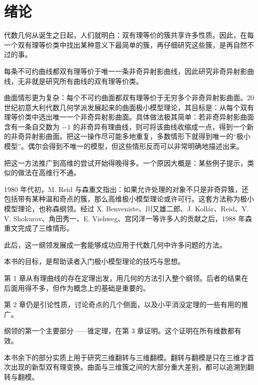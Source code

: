 
\chapter*{绪论}

代数几何从诞生之日起，人们就明白：双有理等价的簇共享许多性质。因此，在每一个双有理等价类中找出某种意义下最简单的簇，再仔细研究这些簇，是再自然不过的事。

每条不可约曲线都双有理等价于唯一一条非奇异射影曲线，因此研究非奇异射影曲线，无非就是研究所有曲线的双有理等价类。

曲面情形更为复杂：每个不可约曲面都双有理等价于无穷多个非奇异射影曲面。20 世纪初意大利代数几何学派发展起来的曲面极小模型理论，其目标是：从每个双有理等价类中选出唯一一个非奇异射影曲面。具体做法极其简单：若非奇异射影曲面含有一条自交数为 $-1$ 的非奇异有理曲线，则可将该曲线收缩成一点，得到一个新的非奇异射影曲面。把这一操作尽可能多地重复，多数情形下就得到唯一的“极小模型”。偶尔会得到不唯一的模型，但这些情形反而可以非常明确地描述出来。

把这一方法推广到高维的尝试开始得晚得多。一个原因大概是：某些例子提示，类似的做法在高维行不通。

1980 年代初，M. Reid 与森重文指出：如果允许处理的对象不只是非奇异簇，还包括带有某种温和奇点的簇，那么高维极小模型理论或许可行。这套方法称为极小模型理论，也称森纲领。经过 X. Benveniste、川又雄二郎、J. Kollár、Reid、V. V. Shokurov、角田秀一、E. Viehweg、宫冈洋一等许多人的贡献之后，1988 年森重文完成了三维情形。

此后，这一纲领发展成一套能够成功应用于代数几何中许多问题的方法。

本书的目标，是帮助读者入门极小模型理论的技巧与思想。

第 1 章从有理曲线的存在定理出发，用几何的方法引入整个纲领。后者的结果在后面用得不多，但作为概念上的基础是重要的。

第 2 章仍是引论性质，讨论奇点的几个侧面，以及小平消没定理的一些有用的推广。

纲领的第一个主要部分——锥定理，在第 3 章证明。这个证明在所有维数都有效。

本书余下的部分实质上用于研究三维翻转与三维翻模。翻转与翻模是只在三维才首次出现的新型双有理变换。曲面与三维簇之间的大部分重大差别，都可以追溯到翻转与翻模。

